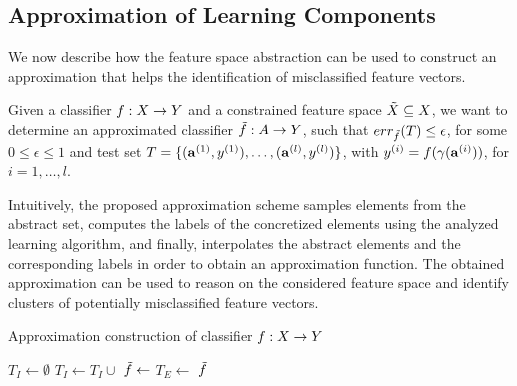 \subsection{Approximation of Learning Components}
\label{sec:approx_ML}

We now describe how the feature space abstraction can be used to construct an
approximation that helps the identification of misclassified feature vectors.

Given a classifier $f : X \to Y$ and a constrained feature space $\tilde{X} \subseteq X$,
we want to determine an approximated classifier $\tilde{f} : A \to Y$, such that
$err_{\tilde{f}}(T) \leq \epsilon$, for some $0 \leq \epsilon \leq 1$
and test set $T = \{ (\mathbf{a}^{(1)},y^{(1)}), \dots,  (\mathbf{a}^{(l)},y^{(l)}) \}$, with $y^{(i)} = f(\gamma(\mathbf{a}^{(i)}))$,
for $i = 1,\dots, l$.

Intuitively, the proposed approximation scheme samples elements from 
the abstract set, computes the labels of the concretized elements using the 
analyzed learning algorithm, and finally, interpolates the abstract elements
and the corresponding labels in order to obtain an approximation function.
The obtained approximation can be used to reason on the considered 
feature space and identify clusters of potentially misclassified feature vectors.

\begin{algorithm}
	\caption{Approximation construction of classifier $f : X \to Y$}
    	\label{algo:approximation}
    	\begin{algorithmic}[1]
			\State $T_I \gets \emptyset$
			\Repeat
	 	 		\State $T_I \gets T_I \cup$ \label{ln:ti_samp}
				\State $\tilde{f} \gets$ \label{ln:interp}
				\State $T_E \gets$ 
			\label{ln:halt_con}
			\State \Return $\tilde{f}$
      		\EndFunction
  	\end{algorithmic} 
\end{algorithm}

